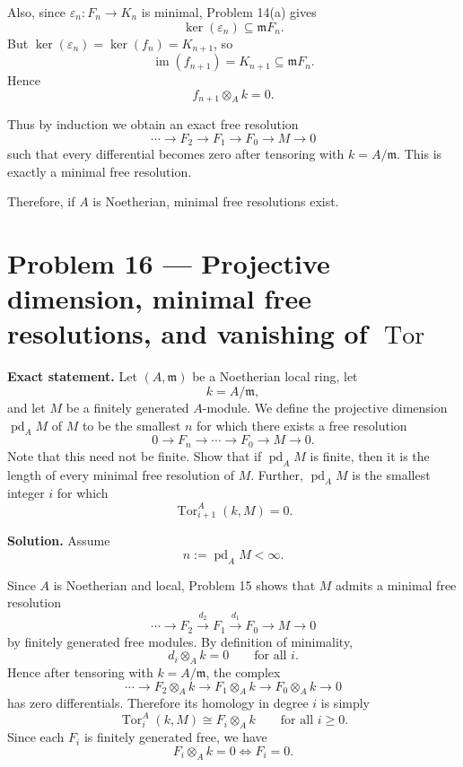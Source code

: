 \documentclass[12pt,a4paper]{article}
\theoremstyle{notespace}
\begin{document}
Also, since \(\varepsilon_n:F_n\to K_n\) is minimal, Problem 14(a) gives
\[
\ker(\varepsilon_n)\subseteq \mathfrak m F_n.
\]
But \(\ker(\varepsilon_n)=\ker(f_n)=K_{n+1}\), so
\[
\operatorname{im}(f_{n+1})=K_{n+1}\subseteq \mathfrak m F_n.
\]
Hence
\[
f_{n+1}\otimes_A k=0.
\]

Thus by induction we obtain an exact free resolution
\[
\cdots \to F_2\to F_1\to F_0\to M\to 0
\]
such that every differential becomes zero after tensoring with \(k=A/\mathfrak m\). This is exactly a minimal free resolution.

\medskip

Therefore, if \(A\) is Noetherian, minimal free resolutions exist.

\section{Problem 16 --- Projective dimension, minimal free resolutions, and vanishing of \texorpdfstring{$\operatorname{Tor}$}{Tor}}

\textbf{Exact statement.}
Let \((A,\mathfrak m)\) be a Noetherian local ring, let
\[
k=A/\mathfrak m,
\]
and let \(M\) be a finitely generated \(A\)-module. We define the projective dimension \(\operatorname{pd}_A M\) of \(M\) to be the smallest \(n\) for which there exists a free resolution
\[
0\to F_n\to \cdots \to F_0\to M\to 0.
\]
Note that this need not be finite. Show that if \(\operatorname{pd}_A M\) is finite, then it is the length of every minimal free resolution of \(M\). Further, \(\operatorname{pd}_A M\) is the smallest integer \(i\) for which
\[
\operatorname{Tor}_{i+1}^A(k,M)=0.
\]

\textbf{Solution.}
Assume
\[
n:=\operatorname{pd}_A M<\infty.
\]

Since \(A\) is Noetherian and local, Problem 15 shows that \(M\) admits a minimal free resolution
\[
\cdots \longrightarrow F_2 \xrightarrow{d_2} F_1 \xrightarrow{d_1} F_0 \longrightarrow M \longrightarrow 0
\]
by finitely generated free modules. By definition of minimality,
\[
d_i\otimes_A k=0
\qquad\text{for all }i.
\]
Hence after tensoring with \(k=A/\mathfrak m\), the complex
\[
\cdots \longrightarrow F_2\otimes_A k \longrightarrow F_1\otimes_A k \longrightarrow F_0\otimes_A k \longrightarrow 0
\]
has zero differentials. Therefore its homology in degree \(i\) is simply
\[
\operatorname{Tor}_i^A(k,M)\cong F_i\otimes_A k
\qquad\text{for all }i\ge 0.
\]
Since each \(F_i\) is finitely generated free, we have
\[
F_i\otimes_A k=0 \iff F_i=0.
\]
\end{document}
